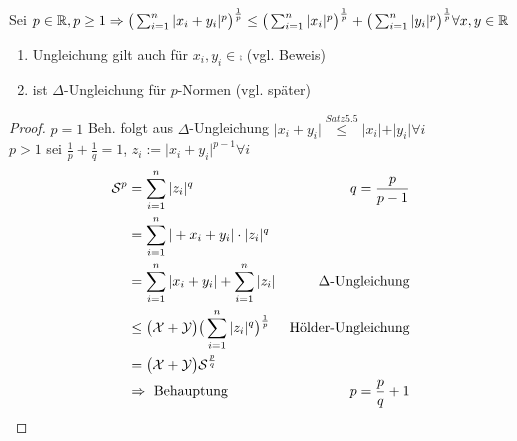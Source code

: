 \begin{satz}
    Sei $p\in \mathbb{R}, p \geq 1 \Rightarrow \big(\sum_{i=1}^{n} \vert x_i + y_i \vert^p \big)^\frac{1}{p} \leq \big(\sum_{i=1}^{n} \vert x_i \vert^p \big)^\frac{1}{p} + \big(\sum_{i=1}^{n} \vert y_i \vert^p \big)^\frac{1}{p}\forall x,y\in \mathbb{R}$
\end{satz}

\begin{remark}
	\begin{enumerate}[label={\arabic*)}]
    \item Ungleichung gilt auch für $x_i, y_i \in \comp$ (vgl. Beweis)
    \item ist $\Delta$-Ungleichung für $p$-Normen (vgl. später)
    \end{enumerate}
\end{remark}

\begin{proof}
	$p=1$ Beh. folgt aus $\Delta$-Ungleichung $\vert x_i + y_i\vert \overset{Satz 5.5}{\leq} \vert x_i \vert + \vert y_i \vert \forall i$\\ $p>1$ sei $\frac{1}{p} + \frac{1}{q} = 1$, $z_i:=\vert x_i + y_i\vert^{p-1}\forall i$
    \begin{align*}
        \mathcal{S}^p &= \sum_{i=1}^{n} \vert z_i \vert^q & q = \frac{p}{p-1}\\
        & = \sum_{i=1}^{n} \vert +x_i+y_i \vert\cdot\vert z_i \vert^q & \\
        & = \sum_{i=1}^{n} \vert x_i + y_i \vert + \sum_{i=1}^{n} \vert z_i \vert & \Delta\text{-Ungleichung}\\
        & \leq \big(\mathcal{X+Y}\big)\big(\sum_{i=1}^{n} \vert z_i\vert^q \big)^\frac{1}{p} & \text{Hölder-Ungleichung}\\
        & = \big(\mathcal{X+Y}\big)\mathcal{S}^\frac{p}{q} & \\
        & \Rightarrow \text{ Behauptung} & p=\frac{p}{q}+1
    \end{align*}\QEDA
\end{proof}


